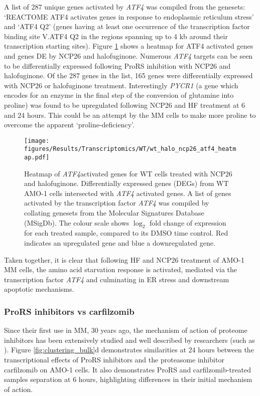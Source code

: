 A list of 287 unique genes activated by \textit{ATF4} was compiled from the genesets: `REACTOME ATF4 activates genes in response to endoplasmic reticulum stress' and `ATF4 Q2' (genes having at least one occurrence of the transcription factor binding site V.ATF4 Q2 in the regions spanning up to 4 kb around their transcription starting sites).
Figure \ref{fig:wt_atf4_heatmap} shows a heatmap for ATF4 activated genes and genes DE by NCP26 and halofuginone.
Numerous \textit{ATF4} targets can be seen to be differentially expressed following ProRS inhibition with NCP26 and halofuginone.
Of the 287 genes in the list, 165 genes were differentially expressed with NCP26 or halofuginone treatment.
Interestingly \textit{PYCR1} (a gene which encodes for an enzyme in the final step of the conversion of glutamine into proline) was found to be upregulated following NCP26 and HF treatment at 6 and 24 hours.
This could be an attempt by the MM cells to make more proline to overcome the apparent `proline-deficiency'.


\begin{figure}[p]
\centering
\texttt{[image: figures/Results/Transcriptomics/WT/wt\_halo\_ncp26\_atf4\_heatmap.pdf]}
\caption[Heatmap of \textit{ATF4} activated genes for ProRS treated WT cells]{Heatmap of \textit{ATF4}activated genes for WT cells treated with NCP26 and halofuginone.
Differentially expressed genes (DEGs) from WT AMO-1 cells intersected with \textit{ATF4} activated genes.
A list of genes activated by the transcription factor \textit{ATF4} was compiled by collating genesets from the Molecular Signatures Database (MSigDb).
The colour scale shows $\log_{2}$ fold change of expression for each treated sample, compared to its DMSO time control.
Red indicates an upregulated gene and blue a downregulated gene.
}
\label{fig:wt_atf4_heatmap}
\end{figure}

Taken together, it is clear that following HF and NCP26 treatment of AMO-1 MM cells, the amino acid starvation response is activated, mediated via the transcription factor \textit{ATF4} and culminating in ER stress and downstream apoptotic mechanisms.

\subsubsection{ProRS inhibitors vs carfilzomib}
Since their first use in MM, 30 years ago, the mechanism of action of proteome inhibitors has been extensively studied and well described by researchers (such as \cite{nunes2017proteasome}).
Figure \ref{fig:clustering_bulk}d demonstrates similarities at 24 hours between the transcriptional effects of ProRS inhibitors and the proteasome inhibitor carfilzomib on AMO-1 cells.
It also demonstrates ProRS and carfilzomib-treated samples separation at 6 hours, highlighting differences in their initial mechanism of action.

